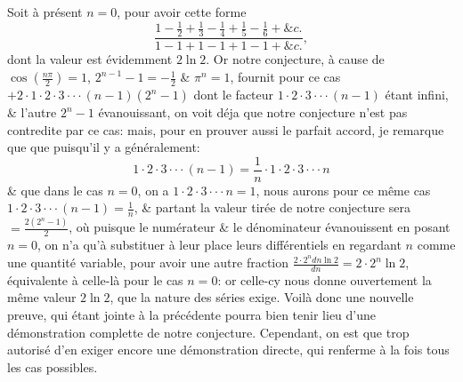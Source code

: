 \documentclass[12pt]{article}
\theoremstyle{definition}
\begin{document}
Soit à présent $n = 0$, pour avoir cette forme $$\frac{1 - \frac{1}{2} + \frac{1}{3} - \frac{1}{4} + \frac{1}{5} - \frac{1}{6} + \&c.}{1 - 1 + 1 - 1 + 1 - 1 + \&c.},$$
dont la valeur est évidemment $2\ln 2$. Or notre conjecture, à cause de $\cos(\frac{n\pi}{2}) = 1$, $2^{n-1} - 1 = -\frac{1}{2}$ \& $\pi^n = 1$, fournit pour ce cas $+2\cdot 1\cdot 2\cdot 3 \cdot \cdot \cdot (n-1)(2^n - 1)$ dont le facteur $1\cdot 2\cdot 3 \cdot \cdot \cdot (n-1)$ étant infini, \& l'autre $2^n - 1$ évanouissant, on voit déja que notre conjecture n'est pas contredite par ce cas: mais, pour en prouver aussi le parfait accord, je remarque que que puisqu'il y a généralement:
$$1\cdot 2 \cdot 3 \cdot \cdot \cdot (n-1) = \frac{1}{n}\cdot 1\cdot 2 \cdot 3 \cdot \cdot \cdot n$$
\& que dans le cas $n = 0$, on a $1\cdot 2 \cdot 3 \cdot \cdot \cdot n = 1$, nous aurons pour ce même cas $1\cdot 2 \cdot 3 \cdot \cdot \cdot (n-1) = \frac{1}{n}$, \& partant la valeur tirée de notre conjecture sera $ = \frac{2(2^n - 1)}{2}$, où puisque le numérateur \& le dénominateur évanouissent en posant $n = 0$, on n'a qu'à substituer à leur place leurs différentiels en regardant $n$ comme une quantité variable, pour avoir une autre fraction $\frac{2 \cdot 2^n dn \ln 2}{dn} = 2\cdot 2^n \ln 2$, équivalente à celle-là pour le cas $n = 0$: or celle-cy nous donne ouvertement la même valeur $2\ln 2$, que la nature des séries exige. Voilà donc une nouvelle preuve, qui étant jointe à la précédente pourra bien tenir lieu d'une démonstration complette de notre conjecture. Cependant, on est que trop autorisé d'en exiger encore une démonstration directe, qui renferme à la fois tous les cas possibles.
\end{document}
